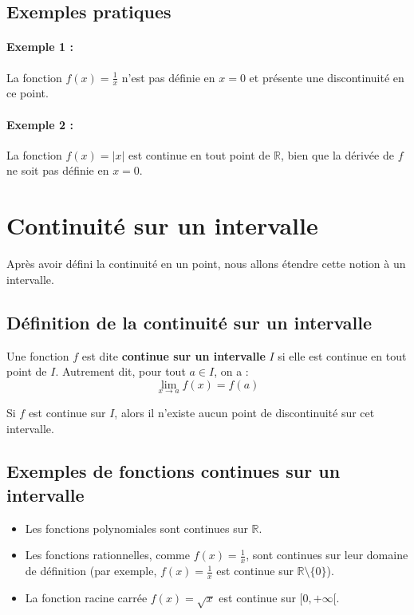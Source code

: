 \documentclass{article}
\begin{document}
	\subsection{Exemples pratiques}
	
	\paragraph{Exemple 1 :}
	La fonction \( f(x) = \frac{1}{x} \) n'est pas définie en \( x = 0 \) et présente une discontinuité en ce point.
	
	\paragraph{Exemple 2 :}
	La fonction \( f(x) = |x| \) est continue en tout point de \( \mathbb{R} \), bien que la dérivée de \( f \) ne soit pas définie en \( x = 0 \).
	\section{Continuité sur un intervalle}
	
	Après avoir défini la continuité en un point, nous allons étendre cette notion à un intervalle.
	
	\subsection{Définition de la continuité sur un intervalle}
	
	Une fonction \( f \) est dite \textbf{continue sur un intervalle} \( I \) si elle est continue en tout point de \( I \). Autrement dit, pour tout \( a \in I \), on a :
	\[
	\lim_{x \to a} f(x) = f(a)
	\]
	
	Si \( f \) est continue sur \( I \), alors il n'existe aucun point de discontinuité sur cet intervalle.
	
	\subsection{Exemples de fonctions continues sur un intervalle}
	
	\begin{itemize}
		\item Les fonctions polynomiales sont continues sur \( \mathbb{R} \).
		\item Les fonctions rationnelles, comme \( f(x) = \frac{1}{x} \), sont continues sur leur domaine de définition (par exemple, \( f(x) = \frac{1}{x} \) est continue sur \( \mathbb{R} \setminus \{0\} \)).
		\item La fonction racine carrée \( f(x) = \sqrt{x} \) est continue sur \( [0, +\infty[ \).
	\end{itemize}
	
\end{document}
